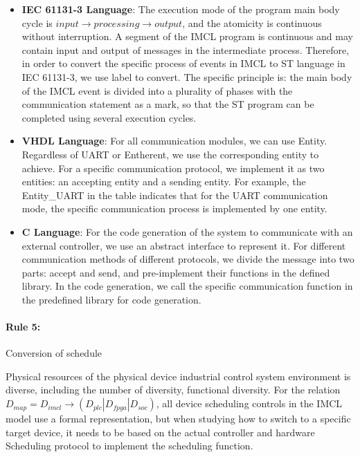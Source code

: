 \begin{itemize}
  \item \textbf{IEC 61131-3 Language}: The execution mode of the program main body cycle is $input\rightarrow processing\rightarrow output$, and the atomicity is continuous without interruption. A segment of the IMCL program is continuous and may contain input and output of messages in the intermediate process. Therefore, in order to convert the specific process of events in IMCL to ST language in IEC 61131-3, we use label to convert. The specific principle is: the main body of the IMCL event is divided into a plurality of phases with the communication statement as a mark, so that the ST program can be completed using several execution cycles.
  \item \textbf{VHDL Language}: For all communication modules, we can use Entity. Regardless of UART or Entherent, we use the corresponding entity to achieve. For a specific communication protocol, we implement it as two entities: an accepting entity and a sending entity. For example, the Entity\_UART in the table indicates that for the UART communication mode, the specific communication process is implemented by one entity.
  \item \textbf{C Language}:  For the code generation of the system to communicate with an external controller, we use an abstract interface to represent it. For different communication methods of different protocols, we divide the message into two parts: accept and send, and pre-implement their functions in the defined library. In the code generation, we call the specific communication function in the predefined library for code generation.
\end{itemize}


\paragraph{\textbf{Rule 5: }} Conversion of schedule

Physical resources of the physical device industrial control system environment is diverse, including the number of diversity, functional diversity. For the relation $D_{map} = D_{imcl} \rightarrow (D_{plc} | D_{fpga} | D_{soc})$, all device scheduling controls in the IMCL model use a formal representation, but when studying how to switch to a specific target device, it needs to be based on the actual controller and hardware Scheduling protocol to implement the scheduling function.


